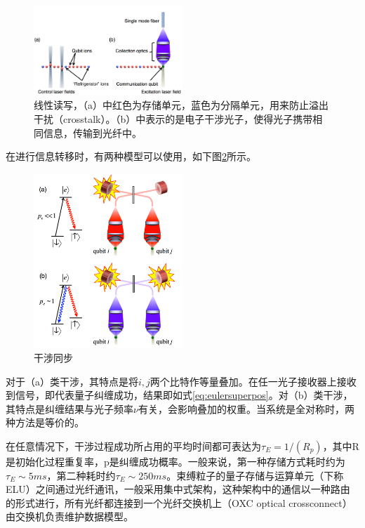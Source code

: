 \documentclass[UTF8, 11pt, a4paper]{ctexart}
\begin{document}
\begin{figure}[H]
	\centering
	\includegraphics[width=0.5\textwidth]{qubit_read}
	\caption{线性读写，（a）中红色为存储单元，蓝色为分隔单元，用来防止溢出干扰（crosstalk）。（b）中表示的是电子干涉光子，使得光子携带相同信息，传输到光纤中。}
	\label{gf:qubit_read}
\end{figure}

在进行信息转移时，有两种模型可以使用，如下图\ref{gf:interfere}所示。

\begin{figure}[H]
	\centering
	\includegraphics[width=0.5\textwidth]{interfere}
	\caption{干涉同步}
	\label{gf:interfere}
\end{figure}

对于（a）类干涉，其特点是将$i,j$两个比特作等量叠加。在任一光子接收器上接收到信号，即代表量子纠缠成功，结果即如式\ref{eq:eulersuperpos}。对（b）类干涉，其特点是纠缠结果与光子频率$\nu$有关，会影响叠加的权重。当系统是全对称时，两种方法是等价的。

在任意情况下，干涉过程成功所占用的平均时间都可表达为$\tau_{E}=1/(R_{p})$\cite{largeq}，其中R是初始化过程重复率，p是纠缠成功概率。一般来说，第一种存储方式耗时约为$\tau_{E} \sim 5ms$，第二种耗时约$\tau_{E} \sim 250ms$。束缚粒子的量子存储与运算单元（下称ELU）之间通过光纤通讯，一般采用集中式架构，这种架构中的通信以一种路由的形式进行，所有光纤都连接到一个光纤交换机上（OXC optical crossconnect）由交换机负责维护数据模型。
\end{document}

